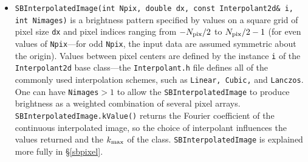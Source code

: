 \documentclass[11pt,preprint,flushrt]{aastex}
\begin{document}
\begin{itemize}
\item {\tt SBInterpolatedImage(int Npix, double dx, const Interpolant2d\& i, int Nimages)} is a brightness pattern specified by values on a square grid of pixel size {\tt dx} and pixel indices ranging from $-N_{\rm pix}/2$ to $N_{\rm pix}/2-1$ (for even values of {\tt Npix}---for odd {\tt Npix}, the input data are assumed symmetric about the origin).  Values between pixel centers are defined by the instance {\tt i} of the {\tt Interpolant2d} base class---the {\tt Interpolant.h} file defines all of the commonly used interpolation schemes, such as {\tt Linear, Cubic,} and {\tt Lanczos}.  One can have {\tt Nimages}$>1$ to allow the {\tt SBInterpolatedImage} to produce brightness as a weighted combination of several pixel arrays.  {\tt SBInterpolatedImage.kValue()} returns the Fourier coefficient of the continuous interpolated image, so the choice of interpolant influences the values returned and the $k_{\rm max}$ of the class.  {\tt SBInterpolatedImage} is explained more fully in \S\ref{sbpixel}.
\end{itemize}
\end{document}
